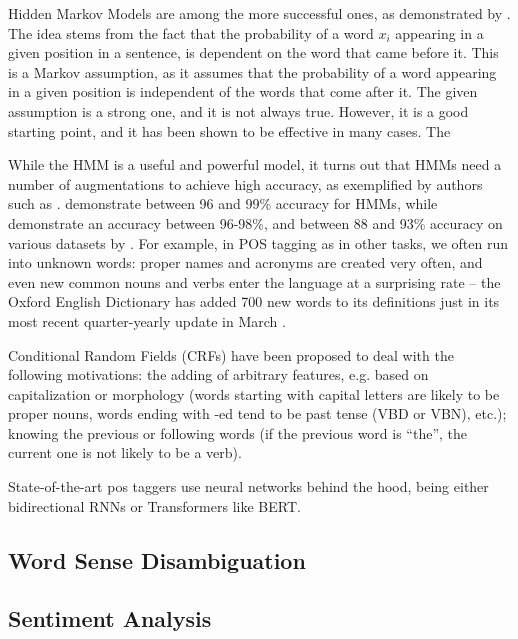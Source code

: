 Hidden Markov Models are among the more successful ones, as demonstrated by \cite{schutze1994part,thede1999second,nigam1999maximumentropy}. The idea stems from the fact that the probability of a word $x_i$ appearing in a given position in a sentence, is dependent on the word that came before it. This is a Markov assumption, as it assumes that the probability of a word appearing in a given position is independent of the words that come after it. The given assumption is a strong one, and it is not always true. However, it is a good starting point, and it has been shown to be effective in many cases. The 

While the HMM is a useful and powerful model, it turns out that HMMs need a number of augmentations to achieve high accuracy, as exemplified by authors such as \cite{goldberg2008can}. \cite{10.3115/974147.974178postaggingmarkov} demonstrate between 96 and 99\% accuracy for HMMs, while \cite{thede1999second} demonstrate an accuracy between 96-98\%, and between 88 and 93\% accuracy on various datasets by \cite{goldberg2008can}. For example, in POS tagging as in other tasks, we often run into unknown words: proper names and acronyms are created very often, and even new common nouns and verbs enter the language at a surprising rate -- the Oxford English Dictionary has added 700 new words to its definitions just in its most recent quarter-yearly update in March \citep{oed2023englishupdates}. 

Conditional Random Fields (CRFs) have been proposed to deal with the following motivations: the adding of arbitrary features, e.g. based on capitalization or morphology (words starting with capital letters are likely to be proper nouns, words ending with -ed tend to be past tense (VBD or VBN), etc.); knowing the previous or following words (if the previous word is ``the'', the current one is not likely to be a verb).

State-of-the-art \acrshort{pos} taggers use neural networks behind the hood, being either bidirectional RNNs or Transformers like BERT. 

\subsection{Word Sense Disambiguation}

\subsection{Sentiment Analysis}

